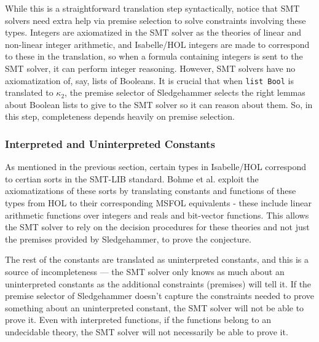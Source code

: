 \documentclass[11pt]{article}
\begin{document}
	While this is a straightforward
	translation step syntactically, 
	notice that SMT solvers need 
	extra help via premise selection 
	to solve constraints involving 
	these types. Integers are 
	axiomatized in the SMT solver as 
	the theories of linear and 
	non-linear integer arithmetic, and 
	Isabelle/HOL integers are made to 
	correspond to these in the translation, 
	so when a formula containing 
	integers is sent to the SMT solver, 
	it can perform integer reasoning. 
	However, SMT solvers have no 
	axiomatization of, say, lists 
	of Booleans. It is crucial that when 
	\texttt{list Bool} is 
	translated to $\kappa_2$, the 
	premise selector of Sledgehammer
	selects the right lemmas about 
	Boolean lists to give to the 
	SMT solver so it can reason 
	about them. So, in this step, 
	completeness depends heavily on 
	premise selection.
	
	\subsubsection{Interpreted and Uninterpreted Constants}
	As mentioned in the previous section,
	certain types in Isabelle/HOL correspond
	to certian sorts in the SMT-LIB standard.
	Bohme et al. exploit the axiomatizations 
	of these sorts by translating constants 
	and functions of these types from HOL to 
	their corresponding MSFOL equivalents - these 
	include linear arithmetic functions over 
	integers and reals and bit-vector 
	functions. This allows the SMT solver
	to rely on the decision procedures for 
	these theories and not just the premises
	provided by Sledgehammer, to prove the 
	conjecture. 
	
	The rest of the constants are 
	translated as uninterpreted constants, 
	and this is a source of 
	incompleteness --- the SMT solver only 
	knows as much about an uninterpreted 
	constants as the additional constraints 
	(premises) will tell it. If the premise 
	selector of Sledgehammer doesn't capture 
	the constraints needed to prove something
	about an uninterpreted constant, the SMT 
	solver will not be able to prove it.
	Even with interpreted functions, if the 
	functions belong to an undecidable theory,
	the SMT solver will not necessarily be 
	able to prove it.
	
\end{document}
